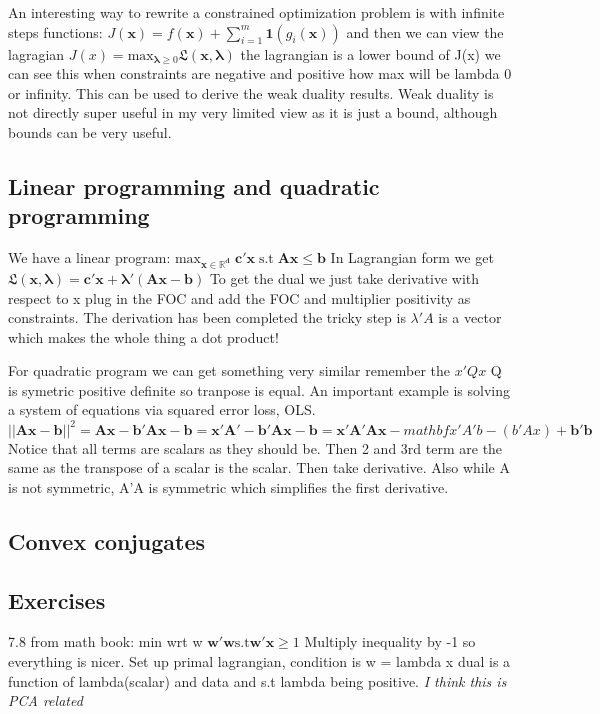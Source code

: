 \documentclass{article}
\begin{document}
An interesting way to rewrite a constrained optimization problem is with infinite steps functions: 
$J(\mathbf{x}) = f(\mathbf{x}) + \sum_{i=1}^{m}\mathbf{1}(g_i(\mathbf{x}))$ and then we can view the lagragian 
$J(x) = \text{max}_{\mathbf{\lambda} \geq 0}\mathfrak{L}(\mathbf{x,\lambda}) $ the lagrangian is a lower bound of J(x) we can see 
this when constraints are negative and positive how max will be lambda 0 or infinity. This can be used to derive the weak 
duality results. Weak duality is not directly super useful in my very limited view as it is just a bound, although bounds can be
very useful. 

\subsection*{Linear programming and quadratic programming}

We have a linear program: $\text{max}_{\mathbf{\mathbf{x} \in \mathbb{R}^d}}\; \mathbf{c'x}\;  \text{s.t}\; \mathbf{Ax} \leq \mathbf{b} $
In Lagrangian form we get $\mathfrak{L}(\mathbf{x,\lambda})  = \mathbf{c'x} +  \mathbf{\lambda' (Ax - b)} $
To get the dual we just take derivative with respect to x plug in the FOC and add the FOC and multiplier positivity as constraints. 
The derivation has been completed the tricky step is $\lambda'A$ is a vector which makes the whole thing a dot product!

For quadratic program we can get something very similar remember the $x'Qx$ Q is symetric positive definite so tranpose is equal. 
An important example is solving a system of equations via squared error loss, OLS. 
$$||\mathbf{Ax -b}||^2 = \mathbf{Ax -b}'\mathbf{Ax -b} = \mathbf{x'A' -b'} \mathbf{Ax -b} = \mathbf{x'A'Ax} - mathbf{x'A'b} - (b'Ax) +\mathbf{b'b}$$
Notice that all terms are scalars as they should be. Then 2 and 3rd term are the same as the transpose of a scalar is the scalar. Then take derivative. 
Also while A is not symmetric, A'A is symmetric which simplifies the first derivative.

\subsection*{Convex conjugates}

\subsection*{Exercises}
7.8 from math book: min wrt w $\mathbf{w'w} \text{s.t} \mathbf{w'x}\geq 1$
Multiply inequality by -1 so everything is nicer. Set up primal lagrangian, condition is w = lambda x 
dual is a function of lambda(scalar) and data and s.t lambda being positive. 
\textit{I think this is PCA related} 
\end{document}
